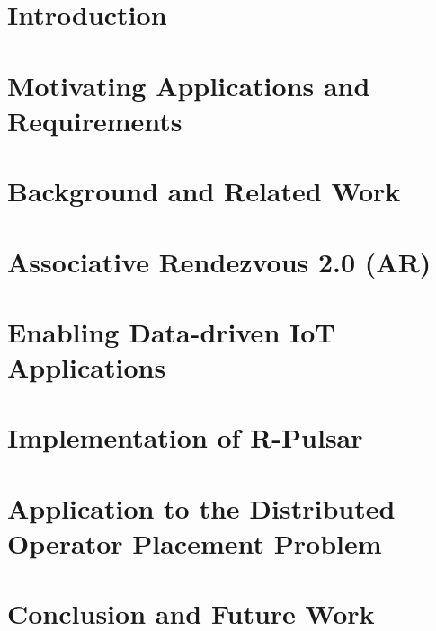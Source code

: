 \documentclass{ruthesis}
\begin{document}
\beforepreface
{}
\dedication{The body of the dedication}
\afterpreface

\listoftables
\listoffigures

\chapter{Introduction}

\chapter{Motivating Applications and Requirements}

\chapter{Background and Related Work}

\chapter{Associative Rendezvous 2.0 (AR)}

\chapter{Enabling Data-driven IoT Applications}

\chapter{Implementation of R-Pulsar}

\chapter{Application to the Distributed Operator Placement Problem}

\chapter{Conclusion and Future Work}





\end{document}
